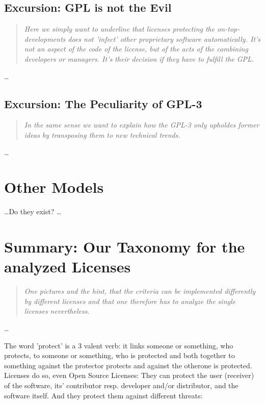 \subsection{Excursion: GPL is not the Evil}
\footnotesize
\begin{quote}\itshape
Here we simply want to underline that licenses protecting the
on-top-developments does not 'infect' other proprietary software automatically.
It's not an aspect of the code of the license, but of the acts of the combining
developers or managers. It's their decision if they have to fulfill the GPL.
\end{quote}
\normalsize
\ldots

\subsection{Excursion: The Peculiarity of GPL-3}
\footnotesize
\begin{quote}\itshape
In the same sense we want to explain how the GPL-3 only upholdes former ideas by
transposing them to new technical trends.
\end{quote}
\normalsize
\ldots

\section{Other Models}
\ldots Do they exist? \ldots

\section{Summary: Our Taxonomy for the analyzed Licenses}
\footnotesize
\begin{quote}\itshape
One pictures and the hint, that the criteria can be implemented differently by
different licenses and that one therefore has to analyze the single licenses
nevertheless.
\end{quote}
\normalsize
\ldots


The word 'protect' is a 3 valent verb: it links someone or something, who
protects, to someone or something, who is protected and both together to
something against the protector protects and against the otherone is protected.
Licenses do so, even Open Source Licenses: They can protect the user (receiver)
of the software, its' contributor resp. developer and/or distributor, and the
software itself. And they protect them against different threats:


